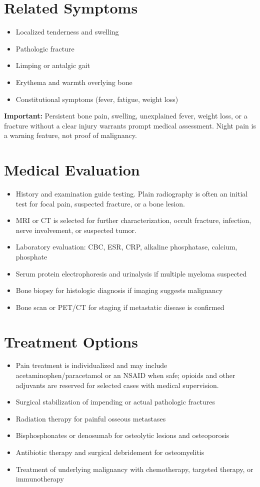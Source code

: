 \section*{Related Symptoms}
\begin{itemize}
 \item Localized tenderness and swelling
 \item Pathologic fracture
 \item Limping or antalgic gait
 \item Erythema and warmth overlying bone
 \item Constitutional symptoms (fever, fatigue, weight loss)
\end{itemize}
\textbf{Important:} Persistent bone pain, swelling, unexplained fever, weight loss, or a fracture without a clear injury warrants prompt medical assessment. Night pain is a warning feature, not proof of malignancy.

\section*{Medical Evaluation}
\begin{itemize}
 \item History and examination guide testing. Plain radiography is often an initial test for focal pain, suspected fracture, or a bone lesion.
 \item MRI or CT is selected for further characterization, occult fracture, infection, nerve involvement, or suspected tumor.
 \item Laboratory evaluation: CBC, ESR, CRP, alkaline phosphatase, calcium, phosphate
 \item Serum protein electrophoresis and urinalysis if multiple myeloma suspected
 \item Bone biopsy for histologic diagnosis if imaging suggests malignancy
 \item Bone scan or PET/CT for staging if metastatic disease is confirmed
\end{itemize}

\section*{Treatment Options}
\begin{itemize}
 \item Pain treatment is individualized and may include acetaminophen/paracetamol or an NSAID when safe; opioids and other adjuvants are reserved for selected cases with medical supervision.
 \item Surgical stabilization of impending or actual pathologic fractures
 \item Radiation therapy for painful osseous metastases
 \item Bisphosphonates or denosumab for osteolytic lesions and osteoporosis
 \item Antibiotic therapy and surgical debridement for osteomyelitis
 \item Treatment of underlying malignancy with chemotherapy, targeted therapy, or immunotherapy
\end{itemize}

